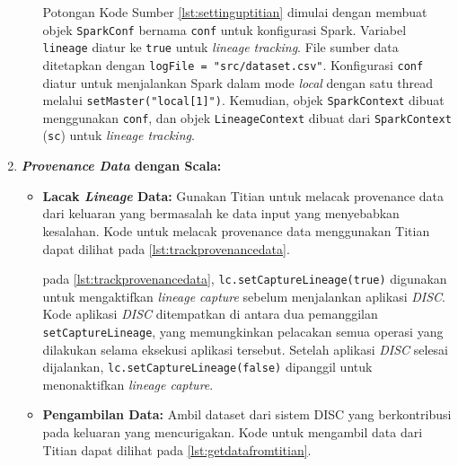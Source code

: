 \begin{enumerate}[topsep=0pt, itemsep=0pt]
\begin{itemize}
      

      Potongan Kode Sumber \ref{lst:settinguptitian} dimulai dengan membuat objek \texttt{SparkConf} bernama \texttt{conf} untuk konfigurasi Spark. Variabel \texttt{lineage} diatur ke \texttt{true} untuk \emph{lineage tracking}. File sumber data ditetapkan dengan \texttt{logFile = "src/dataset.csv"}. Konfigurasi \texttt{conf} diatur untuk menjalankan Spark dalam mode \emph{local} dengan satu thread melalui \texttt{setMaster("local[1]")}. Kemudian, objek \texttt{SparkContext} dibuat menggunakan \texttt{conf}, dan objek \texttt{LineageContext} dibuat dari \texttt{SparkContext} (\texttt{sc}) untuk \emph{lineage tracking}.


  \end{itemize}


  
  
  \item \textbf{\emph{Provenance Data} dengan Scala:}
  \begin{itemize}

    \item \textbf{Lacak \emph{Lineage} Data:} Gunakan Titian untuk melacak provenance data dari keluaran yang bermasalah ke data input yang menyebabkan kesalahan.
    Kode untuk melacak provenance data menggunakan Titian dapat dilihat pada \ref{lst:trackprovenancedata}.

    

    pada \ref{lst:trackprovenancedata}, \texttt{lc.setCaptureLineage(true)} digunakan untuk mengaktifkan \emph{lineage capture} sebelum menjalankan aplikasi \emph{DISC}. Kode aplikasi \emph{DISC} ditempatkan di antara dua pemanggilan \texttt{setCaptureLineage}, yang memungkinkan pelacakan semua operasi yang dilakukan selama eksekusi aplikasi tersebut. Setelah aplikasi \emph{DISC} selesai dijalankan, \texttt{lc.setCaptureLineage(false)} dipanggil untuk menonaktifkan \emph{lineage capture}.


      \item \textbf{Pengambilan Data:} Ambil dataset dari sistem DISC yang berkontribusi pada keluaran yang mencurigakan.
      Kode untuk mengambil data dari Titian dapat dilihat pada \ref{lst:getdatafromtitian}.


\end{itemize}
\end{enumerate}
